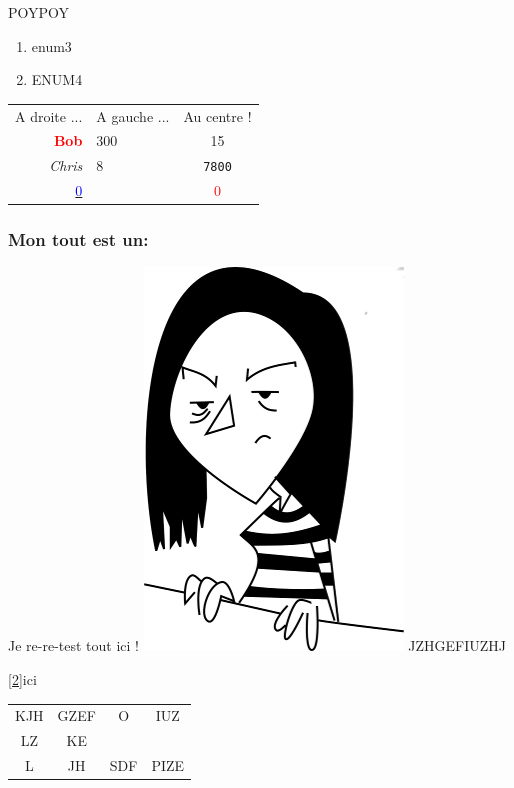 \documentclass[10pt,a4paper]{report}
\begin{document}
POYPOY
\begin{enumerate}
\item enum3
\item ENUM4
\end{enumerate}
\begin{tabular}{rlc}
A droite ... & A gauche ... & Au centre ! \\
{\bf \textcolor{red}{Bob}} & 300 & 15 \\
{\itshape Chris} & 8 & \texttt{7800} \\
\underline{ \textcolor{blue}{0}} & \textcolor{white}{h} & \textcolor{red}{0} \\
\end{tabular}

\subsubsection{Mon tout est un:}
Je re-re-test tout ici !
\includegraphics{Mini_Amel.png}
JZHGEFIUZHJ

\jambon

\ref{2}{ici}

\begin{tabular}{cccc}
KJH & GZEF & O & IUZ \\
LZ & KE & & \\
L & JH & SDF & PIZE \\
\end{tabular}
\end{document}
